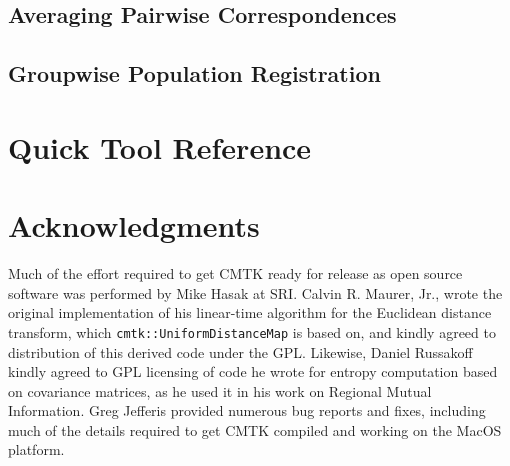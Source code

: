 \documentclass{InsightArticle}
\begin{document}
\subsection{Averaging Pairwise Correspondences}

\subsection{Groupwise Population Registration}

\section{Quick Tool Reference}

\section*{Acknowledgments}

Much of the effort required to get CMTK ready for release as open source
software was performed by Mike Hasak at SRI. Calvin R. Maurer, Jr., wrote the
original implementation of his linear-time algorithm for the Euclidean
distance transform, which \verb|cmtk::UniformDistanceMap| is based on, and
kindly agreed to distribution of this derived code under the GPL. Likewise,
Daniel Russakoff kindly agreed to GPL licensing of code he wrote for entropy
computation based on covariance matrices, as he used it in his work on
Regional Mutual Information. Greg Jefferis provided numerous bug reports and
fixes, including much of the details required to get CMTK compiled and working
on the MacOS platform.

%
%



\end{document}
